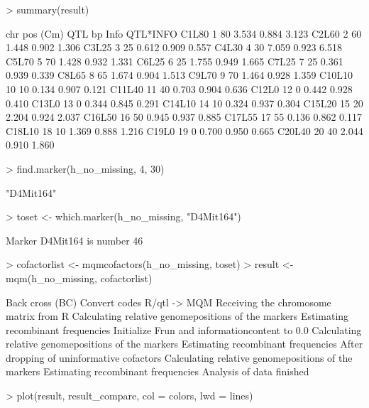 \documentclass[a4paper]{article}
\begin{document}
\begin{Schunk}
\begin{Sinput}
> summary(result)
\end{Sinput}
\begin{Soutput}
       chr pos (Cm) QTL bp  Info QTL*INFO
C1L80    1       80  3.534 0.884    3.123
C2L60    2       60  1.448 0.902    1.306
C3L25    3       25  0.612 0.909    0.557
C4L30    4       30  7.059 0.923    6.518
C5L70    5       70  1.428 0.932    1.331
C6L25    6       25  1.755 0.949    1.665
C7L25    7       25  0.361 0.939    0.339
C8L65    8       65  1.674 0.904    1.513
C9L70    9       70  1.464 0.928    1.359
C10L10  10       10  0.134 0.907    0.121
C11L40  11       40  0.703 0.904    0.636
C12L0   12        0  0.442 0.928    0.410
C13L0   13        0  0.344 0.845    0.291
C14L10  14       10  0.324 0.937    0.304
C15L20  15       20  2.204 0.924    2.037
C16L50  16       50  0.945 0.937    0.885
C17L55  17       55  0.136 0.862    0.117
C18L10  18       10  1.369 0.888    1.216
C19L0   19        0  0.700 0.950    0.665
C20L40  20       40  2.044 0.910    1.860
\end{Soutput}
\begin{Sinput}
> find.marker(h_no_missing, 4, 30)
\end{Sinput}
\begin{Soutput}
[1] "D4Mit164"
\end{Soutput}
\begin{Sinput}
> toset <- which.marker(h_no_missing, "D4Mit164")
\end{Sinput}
\begin{Soutput}
Marker D4Mit164 is number 46 
\end{Soutput}
\begin{Sinput}
> cofactorlist <- mqmcofactors(h_no_missing, toset)
> result <- mqm(h_no_missing, cofactorlist)
\end{Sinput}
\begin{Soutput}
Back cross (BC)
Convert codes R/qtl -> MQM
Receiving the chromosome matrix from R
Calculating relative genomepositions of the markers
Estimating recombinant frequencies
Initialize Frun and informationcontent to 0.0
Calculating relative genomepositions of the markers
Estimating recombinant frequencies
After dropping of uninformative cofactors
Calculating relative genomepositions of the markers
Estimating recombinant frequencies
Analysis of data finished
\end{Soutput}
\begin{Sinput}
> plot(result, result_compare, col = colors, lwd = lines)
\end{Sinput}
\end{Schunk}
\end{document}
